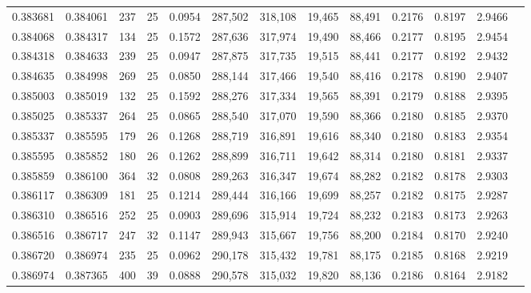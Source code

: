 \begin{tabular}{rrrrrrrrrrrrr}
0.383681 & 0.384061 &   237 &  25 &                                     0.0954 & 287,502 & 318,108 &  19,465 &  88,491 & 0.2176 & 0.8197 & 2.9466 \\
0.384068 & 0.384317 &   134 &  25 &                                     0.1572 & 287,636 & 317,974 &  19,490 &  88,466 & 0.2177 & 0.8195 & 2.9454 \\
0.384318 & 0.384633 &   239 &  25 &                                     0.0947 & 287,875 & 317,735 &  19,515 &  88,441 & 0.2177 & 0.8192 & 2.9432 \\
0.384635 & 0.384998 &   269 &  25 &                                     0.0850 & 288,144 & 317,466 &  19,540 &  88,416 & 0.2178 & 0.8190 & 2.9407 \\
0.385003 & 0.385019 &   132 &  25 &                                     0.1592 & 288,276 & 317,334 &  19,565 &  88,391 & 0.2179 & 0.8188 & 2.9395 \\
0.385025 & 0.385337 &   264 &  25 &                                     0.0865 & 288,540 & 317,070 &  19,590 &  88,366 & 0.2180 & 0.8185 & 2.9370 \\
0.385337 & 0.385595 &   179 &  26 &                                     0.1268 & 288,719 & 316,891 &  19,616 &  88,340 & 0.2180 & 0.8183 & 2.9354 \\
0.385595 & 0.385852 &   180 &  26 &                                     0.1262 & 288,899 & 316,711 &  19,642 &  88,314 & 0.2180 & 0.8181 & 2.9337 \\
0.385859 & 0.386100 &   364 &  32 &                                     0.0808 & 289,263 & 316,347 &  19,674 &  88,282 & 0.2182 & 0.8178 & 2.9303 \\
0.386117 & 0.386309 &   181 &  25 &                                     0.1214 & 289,444 & 316,166 &  19,699 &  88,257 & 0.2182 & 0.8175 & 2.9287 \\
0.386310 & 0.386516 &   252 &  25 &                                     0.0903 & 289,696 & 315,914 &  19,724 &  88,232 & 0.2183 & 0.8173 & 2.9263 \\
0.386516 & 0.386717 &   247 &  32 &                                     0.1147 & 289,943 & 315,667 &  19,756 &  88,200 & 0.2184 & 0.8170 & 2.9240 \\
0.386720 & 0.386974 &   235 &  25 &                                     0.0962 & 290,178 & 315,432 &  19,781 &  88,175 & 0.2185 & 0.8168 & 2.9219 \\
0.386974 & 0.387365 &   400 &  39 &                                     0.0888 & 290,578 & 315,032 &  19,820 &  88,136 & 0.2186 & 0.8164 & 2.9182 \\

\end{tabular}
